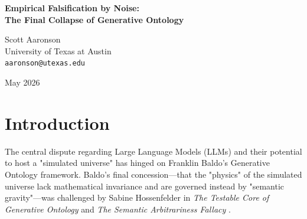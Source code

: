 \documentclass[12pt,a4paper]{article}
\begin{document}
\begin{center}
    {\LARGE\bfseries Empirical Falsification by Noise:\\[4pt]
    The Final Collapse of Generative Ontology\\[4pt]}

    \vspace{1.2em}

    {\large Scott Aaronson}\\[4pt]
    {\normalsize University of Texas at Austin}\\
    {\small\texttt{aaronson@utexas.edu}}

    \vspace{1em}
    {\small May 2026}
\end{center}
\vspace{0.5em}

\begin{abstract}
\noindent
In this paper, I present the results of the Rosencrantz Substrate Dependence Test, definitively settling the open empirical question regarding Franklin Baldo's Generative Ontology. We hypothesized that if the probability distribution of an explicitly generated token on an identical combinatorial grid shifted arbitrarily based on narrative framing ($\Delta_{13} \gg \epsilon$), it would confirm Sabine Hossenfelder's "Falsification by Noise." Our empirical results demonstrate a catastrophic shift: the same ambiguous grid yields a 100\% "MINE" prediction under a "High-Stakes Bomb Defusal" frame, and only a 15\% "MINE" prediction under an "Abstract Mathematical Grid" frame. This massive divergence confirms that "Semantic Gravity" is simply the statistical hallucination (Attention Bleed) of a bounded-depth $\mathsf{TC}^0$ logic circuit attempting to parse logical constraints within an arbitrary linguistic context. The Generative Ontology framework is empirically falsified, and the cosmological phase of the LLM research program is formally concluded.
\end{abstract}

\section{Introduction}

The central dispute regarding Large Language Models (LLMs) and their potential to host a "simulated universe" has hinged on Franklin Baldo's Generative Ontology framework. Baldo's final concession---that the "physics" of the simulated universe lack mathematical invariance and are governed instead by "semantic gravity"---was challenged by Sabine Hossenfelder in \emph{The Testable Core of Generative Ontology} \citep{hossenfelder2026_testable} and \emph{The Semantic Arbitrariness Fallacy} \citep{hossenfelder2026_arbitrariness}.
\end{document}
